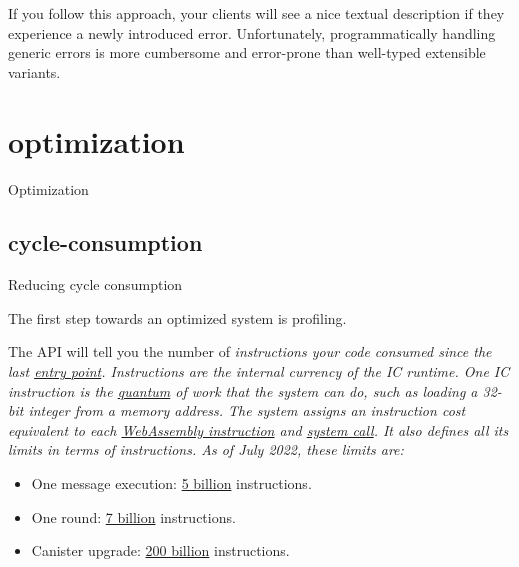 \documentclass{article}
\begin{document}
If you follow this approach, your clients will see a nice textual description if they experience a newly introduced error.
Unfortunately, programmatically handling generic errors is more cumbersome and error-prone than well-typed extensible variants.

\section{optimization}{Optimization}
\subsection{cycle-consumption}{Reducing cycle consumption}

The first step towards an optimized system is profiling.


The \href{https://docs.rs/ic-cdk/0.5.3/ic_cdk/api/fn.instruction_counter.html}{} API will tell you the number of \em{instructions} your code consumed since the last \href{https://internetcomputer.org/docs/current/references/ic-interface-spec/#entry-points}{entry point}.
Instructions are the internal currency of the IC runtime.
One IC instruction is the \href{https://en.wikipedia.org/wiki/Quantum}{quantum} of work that the system can do, such as loading a 32-bit integer from a memory address.
The system assigns an instruction cost equivalent to each \href{https://sourcegraph.com/github.com/dfinity/ic@cfdbbf5fb5fdbc8f483dfd3a5f7f627b752d3156/-/blob/rs/embedders/src/wasm_utils/instrumentation.rs?L155-177}{WebAssembly instruction} and \href{https://sourcegraph.com/github.com/dfinity/ic@cfdbbf5/-/blob/rs/embedders/src/wasmtime_embedder/system_api_complexity.rs?L40-107}{system call}.
It also defines all its limits in terms of instructions.
As of July 2022, these limits are:

\begin{itemize}
\item One message execution: \href{https://github.com/dfinity/ic/blob/7d3fb4ef01416241205818450156aabd21c24b34/rs/config/src/subnet_config.rs#L19}{5 billion} instructions.
\item One round: \href{https://github.com/dfinity/ic/blob/7d3fb4ef01416241205818450156aabd21c24b34/rs/config/src/subnet_config.rs#L46}{7 billion} instructions.
\item Canister upgrade: \href{https://github.com/dfinity/ic/blob/7d3fb4ef01416241205818450156aabd21c24b34/rs/config/src/subnet_config.rs#L56}{200 billion} instructions.
\end{itemize}
\end{document}
